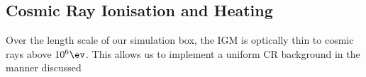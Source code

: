 \subsection{Cosmic Ray Ionisation and Heating}
\label{CRchem}
Over the length scale of our simulation box, the IGM is optically thin to cosmic rays above $10^6\ev$. This allows us to implement a uniform CR background in the manner discussed